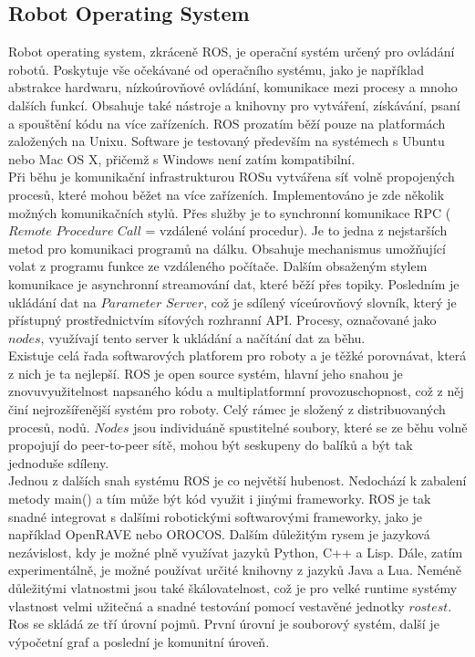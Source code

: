 \documentclass[12pt]{article}
\begin{document}
\subsection{Robot Operating System}
Robot operating system, zkráceně ROS, je operační systém určený pro ovládání robotů. Poskytuje vše očekávané od operačního systému, jako je například abstrakce hardwaru, nízkoúrovňové ovládání, komunikace mezi procesy a mnoho dalších funkcí. Obsahuje také nástroje a knihovny pro vytváření, získávání, psaní a spouštění kódu na více zařízeních. ROS prozatím běží pouze na platformách založených na Unixu. Software je testovaný především na systémech s Ubuntu nebo Mac OS X, přičemž s Windows není zatím kompatibilní.\\
\indent Při běhu je komunikační infrastrukturou ROSu vytvářena síť volně propojených procesů, které mohou běžet na více zařízeních. Implementováno je zde několik možných komunikačních stylů. Přes služby je to synchronní komunikace RPC ($Remote$ $Procedure$ $Call$ = vzdálené volání procedur). Je to jedna z nejstarších metod pro komunikaci programů na dálku. Obsahuje mechanismus umožňující volat z programu funkce ze vzdáleného počítače. Dalším obsaženým stylem komunikace je asynchronní streamování dat, které běží přes topiky. Posledním je ukládání dat na $Parameter$ $Server$, což je sdílený víceúrovňový slovník, který je přístupný prostřednictvím síťových rozhranní API. Procesy, označované jako $nodes$, využívají tento server k ukládání a načítání dat za běhu.\\
\indent Existuje celá řada softwarových platforem pro roboty a je těžké porovnávat, která z nich je ta nejlepší. ROS je open source systém, hlavní jeho snahou je znovuvyužitelnost napsaného kódu a multiplatformní provozuschopnost, což z něj činí nejrozšířenější systém pro roboty. Celý rámec je složený z distribuovaných procesů, nodů. $Nodes$ jsou individuáně spustitelné soubory, které se ze běhu volně propojují do peer-to-peer sítě, mohou být seskupeny do balíků a být tak jednoduše sdíleny.\\
\indent Jednou z dalších snah systému ROS je co největší hubenost. Nedochází k zabalení metody main() a tím může být kód využit i jinými frameworky. ROS je tak snadné integrovat s dalšími robotickými softwarovými frameworky, jako je například OpenRAVE nebo OROCOS. Dalším důležitým rysem je jazyková nezávislost, kdy je možné plně využívat jazyků Python, C++ a Lisp. Dále, zatím experimentálně, je možné používat určité knihovny z jazyků Java a Lua. Neméně důležitými vlatnostmi jsou také škálovatelnost, což je pro velké runtime systémy vlastnost velmi užitečná a snadné testování pomocí vestavěné jednotky $rostest$.\\
\indent Ros se skládá ze tří úrovní pojmů. První úrovní je souborový systém, další je výpočetní graf a poslední je komunitní úroveň.\\
\end{document}
